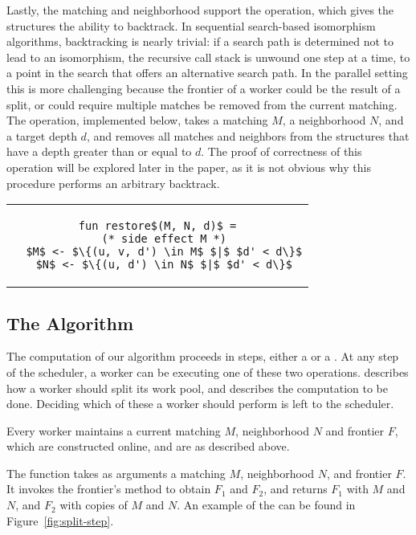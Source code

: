 Lastly, the matching and neighborhood support the
 operation, which gives the structures
the ability to backtrack.
%
In sequential search-based isomorphism algorithms, backtracking is
nearly trivial: if a search path is determined not to lead to an
isomorphism, the recursive call stack is unwound
one step at a time, to a point in the
search that offers an alternative search path.
%
In the parallel setting this is more challenging because
the frontier of a worker could be the result
of a split, or could require multiple matches
be removed from the current matching.
%
The  operation, implemented below, takes
a matching $M$, a neighborhood $N$, and a target depth $d$,
and removes all
matches and neighbors from the structures that have a depth
greater than or equal to $d$.
%
The proof of correctness of this operation will be
explored later in the paper, as it is not obvious why
this procedure performs an arbitrary backtrack.

\begin{tabular}{c}
\begin{lstlisting}
fun restore$(M, N, d)$ =
  (* side effect M *)
  $M$ <- $\{(u, v, d') \in M$ $|$ $d' < d\}$
  $N$ <- $\{(u, d') \in N$ $|$ $d' < d\}$
\end{lstlisting}
\end{tabular}


\subsection{The Algorithm}

The computation of our algorithm proceeds in steps,
either a  or a .
%
At any step of the scheduler, a worker can be
executing one of these two operations.
%
 describes how a worker should split
its work pool, and  describes
the computation to be done.
%
Deciding which of these a worker should perform is left
to the scheduler.

Every worker maintains a current matching $M$, neighborhood $N$
and frontier $F$, which are constructed online, and are as
described above.

The  function takes as arguments a matching $M$,
neighborhood $N$, and frontier $F$. It invokes the frontier's
 method to obtain $F_1$ and $F_2$, and returns $F_1$
with $M$ and $N$, and $F_2$ with copies of $M$ and $N$.
%
An example of the  can be found in Figure~\ref{fig:split-step}.


